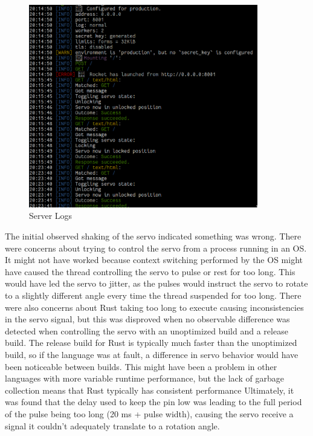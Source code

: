 \documentclass[a4paper]{article}
\begin{document}
\begin{figure}[H]
    \center
    \caption{Server Logs}
    \label{fig:logs}
    \includegraphics[width=10cm]{sesameServerOutput.png}
\end{figure}

The initial observed shaking of the servo indicated something was wrong.
There were concerns about trying to control the servo from a process running in an OS.
It might not have worked because context switching performed by the OS might have caused the thread controlling the servo to pulse or rest for too long.
This would have led the servo to jitter, as the pulses would instruct the servo to rotate to a slightly different angle every time the thread suspended for too long.
There were also concerns about Rust taking too long to execute causing inconsistencies in the servo signal, but this was disproved when no observable difference was detected when controlling the servo with an unoptimized build and a release build.
The release build for Rust is typically much faster than the unoptimized build, so if the language was at fault, a difference in servo behavior would have been noticeable between builds.
This might have been a problem in other languages with more variable runtime performance, but the lack of garbage collection means that Rust typically has consistent performance
Ultimately, it was found that the delay used to keep the pin low was leading to the full period of the pulse being too long (20 ms + pulse width), causing the servo receive a signal it couldn't adequately translate to a rotation angle.
\end{document}
